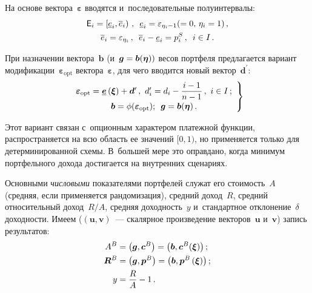 \begin{multicols}{2}
  На основе вектора~$\boldsymbol{\varepsilon}$ вводятся и~последовательные 
полуинтервалы: 
  \begin{multline}
  {\sf E}_i=\left[ \underline{e}_i, \overline{e}_i\right)\,,\enskip
  \underline{e}_i=\varepsilon_{\eta_i-1}(=0,\,\eta_i=1)\,,\\
  \overline{e}_i = \varepsilon_{\eta_i}\,,\enskip \overline{e}_i-\underline{e}_i 
=p_i^S\,,\enskip i\in I\,.
    \label{e8-aga}
  \end{multline}
  
  При назначении вектора~$\boldsymbol{b}$ (и~$\boldsymbol{g}\hm= 
\boldsymbol{b}(\boldsymbol{\eta}))$ весов портфеля предлагается вариант 
модификации~$\boldsymbol{\varepsilon}_{\mathrm{opt}}$ 
вектора~$\boldsymbol{\varepsilon}$, для чего вводится новый 
вектор~$\boldsymbol{d}^\prime$: 
  \begin{equation}
  \left.
  \begin{array}{c}
  \boldsymbol{\varepsilon}_{\mathrm{opt}} = 
\underline{\boldsymbol{e}}\left(\boldsymbol{\xi}\right)+\boldsymbol{d}^\prime\,,\
  d_i^\prime= d_i-\displaystyle\frac{\displaystyle i-1\mathstrut}{\displaystyle n-1\mathstrut}\,,\ i\in I\,;\\[6pt]
   \boldsymbol{b}=\phi 
(\boldsymbol{\varepsilon}_{\mathrm{opt}});\enskip  \boldsymbol{g} = 
\boldsymbol{b}(\boldsymbol{\eta})\,.
\end{array}
\right\}
  \label{e9-aga}
  \end{equation}
  
  Этот вариант связан с~опционным характером платежной функции, 
распространяется на всю область ее значений $[0, 1)$, но применяется только 
для детерминированной схемы. В~большей мере это оправдано, когда минимум 
портфельного дохода достигается на внутренних сценариях. 
  
  Основными \textit{числовыми} показателями портфелей служат его 
стоимость~$A$ (средняя, если применяется рандомизация), средний 
доход~$R$, средний относительный доход~$R /A$, средняя доходность~$y$ 
и~стандартное отклонение~$\delta$ доходности. Имеем ($(\boldsymbol{u}, 
\boldsymbol{v})$~--- скалярное произведение векторов~$\boldsymbol{u}$ 
и~$\boldsymbol{v}$) запись результатов:
  \begin{align*}
  A^B &= \left(\boldsymbol{g},\boldsymbol{c}^{B}\right) = 
\left(\boldsymbol{b},\boldsymbol{c}^B(\boldsymbol{\xi})\right);\\
  \boldsymbol{R}^B &= \left(\boldsymbol{g},\boldsymbol{p}^B\right) = 
  \left(\boldsymbol{b}, \boldsymbol{p}^B\left(\boldsymbol{\xi}\right)\right); \\
   y &=  \displaystyle\frac{\displaystyle R\mathstrut}{\displaystyle A\mathstrut}- 1\,.     
  \end{align*}
  

\end{multicols}
